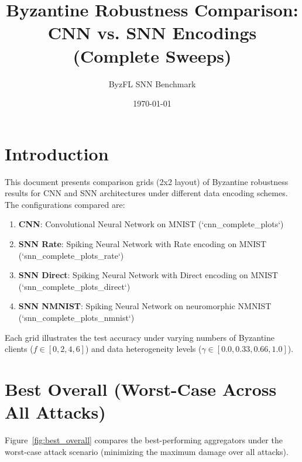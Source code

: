 \documentclass{article}
\title{Byzantine Robustness Comparison:\\CNN vs. SNN Encodings (Complete Sweeps)}
\author{ByzFL SNN Benchmark}
\date{\today}
\begin{document}
\maketitle

\tableofcontents
\newpage

\section{Introduction}
This document presents comparison grids (2x2 layout) of Byzantine robustness results for CNN and SNN architectures under different data encoding schemes. The configurations compared are:
\begin{enumerate}
    \item \textbf{CNN}: Convolutional Neural Network on MNIST (`cnn\_complete\_plots`)
    \item \textbf{SNN Rate}: Spiking Neural Network with Rate encoding on MNIST (`snn\_complete\_plots\_rate`)
    \item \textbf{SNN Direct}: Spiking Neural Network with Direct encoding on MNIST (`snn\_complete\_plots\_direct`)
    \item \textbf{SNN NMNIST}: Spiking Neural Network on neuromorphic NMNIST (`snn\_complete\_plots\_nmnist`)
\end{enumerate}

Each grid illustrates the test accuracy under varying numbers of Byzantine clients ($f \in [0, 2, 4, 6]$) and data heterogeneity levels ($\gamma \in [0.0, 0.33, 0.66, 1.0]$).

\newpage

\section{Best Overall (Worst-Case Across All Attacks)}
\label{sec:best_overall}

Figure~\ref{fig:best_overall} compares the best-performing aggregators under the worst-case attack scenario (minimizing the maximum damage over all attacks).
\end{document}
